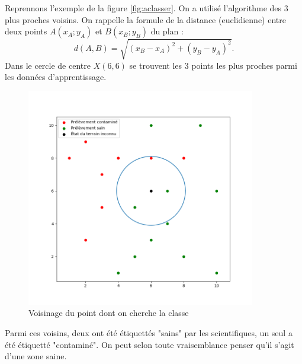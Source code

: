 \documentclass[12pt]{article}                   %
\theoremstyle{exercicestyle}
\theoremstyle{break2}
\theoremstyle{break3}
\begin{document}
\begin{exemple}
    Reprennons l'exemple de la figure \ref{fig:aclasser}. On a utilisé l'algorithme des 3 plus proches voisins.  On rappelle la formule de la distance (euclidienne) entre deux points $A(x_A; y_A)$ et $B(x_B; y_B)$ du plan :
    $$ 
    d(A, B) = \sqrt{(x_B-x_A)^2 + (y_B - y_A)^2}.
    $$
Dans le cercle de centre $X(6, 6)$ se trouvent les 3 points les plus proches parmi les données d'apprentissage.    
    \begin{figure}[!h]
    \begin{center}
        \includegraphics[width=10cm]{Figure_3.png}
        \caption{Voisinage du point dont on cherche la classe}
    \end{center}
    \end{figure}
    
    Parmi ces voisins, deux ont été étiquettés "sains" par les scientifiques, un seul a été étiquetté "contaminé". On peut selon toute vraisemblance penser qu'il s'agit d'une zone saine. 
\end{exemple}
\end{document}
